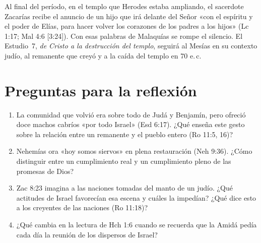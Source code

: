 \documentclass[11pt,letterpaper]{article}
\begin{document}
Al final del período, en el templo que Herodes estaba ampliando, el sacerdote Zacarías recibe el anuncio de un hijo que irá delante del Señor «con el espíritu y el poder de Elías, para hacer volver los corazones de los padres a los hijos» (Lc 1:17; Mal 4:6 [3:24]). Con esas palabras de Malaquías se rompe el silencio. El Estudio~7, \emph{de Cristo a la destrucción del templo}, seguirá al Mesías en su contexto judío, al remanente que creyó y a la caída del templo en 70 e.\,c.

\section*{Preguntas para la reflexión}
\begin{enumerate}
\item La comunidad que volvió era sobre todo de Judá y Benjamín, pero ofreció doce machos cabríos «por todo Israel» (Esd 6:17). ¿Qué enseña este gesto sobre la relación entre un remanente y el pueblo entero (Ro 11:5, 16)?
\item Nehemías ora «hoy somos siervos» en plena restauración (Neh 9:36). ¿Cómo distinguir entre un cumplimiento real y un cumplimiento pleno de las promesas de Dios?
\item Zac 8:23 imagina a las naciones tomadas del manto de un judío. ¿Qué actitudes de Israel favorecían esa escena y cuáles la impedían? ¿Qué dice esto a los creyentes de las naciones (Ro 11:18)?
\item ¿Qué cambia en la lectura de Hch 1:6 cuando se recuerda que la Amidá pedía cada día la reunión de los dispersos de Israel?
\end{enumerate}
\end{document}
